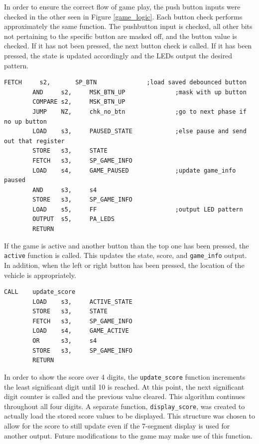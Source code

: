 \documentclass[11pt]{article}
\begin{document}
In order to ensure the correct flow of game play, the push button inputs were checked in the other seen in Figure \ref{game_logic}.  Each button check performs approximately the same function.  The pushbutton input is checked, all other bits not pertaining to the specific button are masked off, and the button value is checked.  If it has not been pressed, the next button check is called.  If it has been pressed, the state is updated accordingly and the LEDs output the desired pattern. 
\vspace{12pt}
\begin{lstlisting}[caption=Function checking if the top button has been pushed, label=chk_up_btn]		
		FETCH	  s2,		SP_BTN				;load saved debounced button
		AND		s2,		MSK_BTN_UP				;mask with up button
		COMPARE s2,		MSK_BTN_UP
		JUMP 	NZ, 	chk_no_btn				;go to next phase if no up button
		LOAD 	s3,		PAUSED_STATE			;else pause and send out that register
		STORE	s3,		STATE
		FETCH	s3,		SP_GAME_INFO
		LOAD 	s4,	    GAME_PAUSED        		;update game_info paused	
		AND		s3,		s4						
		STORE	s3,		SP_GAME_INFO
		LOAD	s5,		FF						;output LED pattern
		OUTPUT	s5,		PA_LEDS
		RETURN	
 \end{lstlisting}
\vspace{12pt}
\hspace{16pt}If the game is active and another button than the top one has been pressed, the \texttt{active} function is called.  This updates the state, score, and \texttt{game\_info} output.  In addition, when the left or right button has been pressed, the location of the vehicle is appropriately.\\

\vspace{12pt}

\begin{lstlisting}[caption=Update the state game info, label=active]		
		CALL	update_score				
		LOAD 	s3,		ACTIVE_STATE
		STORE	s3,		STATE
		FETCH	s3,		SP_GAME_INFO
		LOAD 	s4,		GAME_ACTIVE
		OR		s3,		s4					
		STORE	s3,		SP_GAME_INFO
		RETURN
 \end{lstlisting}


\hspace{16pt}In order to show the score over 4 digits, the \texttt{update\_score} function increments the least significant digit until 10 is reached.  At this point, the next significant digit counter is called and the previous value cleared.  This algorithm continues throughout all four digits. A separate function, \texttt{display\_score}, was created to actually load the stored score values to be displayed.  This structure was chosen to allow for the score to still update even if the 7-segment display is used for another output.  Future modifications to the game may make use of this function.\\		
\end{document}

